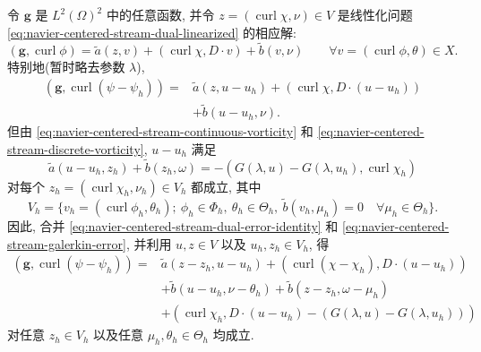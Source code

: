 \begin{Proof}
令 $\boldsymbol g$ 是 $L^2(\Omega)^2$ 中的任意函数, 并令
$z=(\operatorname{curl}\chi,\nu)\in V$ 是线性化问题
\eqref{eq:navier-centered-stream-dual-linearized} 的相应解:
\[
(\boldsymbol g,\operatorname{curl}\phi)
=\widetilde a(z,v)+(\operatorname{curl}\chi,D\cdot v)
+\widetilde b(v,\nu)
\qquad
\forall v=(\operatorname{curl}\phi,\theta)\in X.
\]
特别地(暂时略去参数 $\lambda$),
\begin{equation}\label{eq:navier-centered-stream-dual-error-identity}
\begin{aligned}
(\boldsymbol g,\operatorname{curl}(\psi-\psi_h))
={}&\widetilde a(z,u-u_h)
+(\operatorname{curl}\chi,D\cdot(u-u_h))\\
&+\widetilde b(u-u_h,\nu).
\end{aligned}
\end{equation}
但由 \eqref{eq:navier-centered-stream-continuous-vorticity} 和
\eqref{eq:navier-centered-stream-discrete-vorticity}, $u-u_h$ 满足
\begin{equation}\label{eq:navier-centered-stream-galerkin-error}
\widetilde a(u-u_h,z_h)+\widetilde b(z_h,\omega)
=-(G(\lambda,u)-G(\lambda,u_h),\operatorname{curl}\chi_h)
\end{equation}
对每个 $z_h=(\operatorname{curl}\chi_h,\nu_h)\in V_h$ 都成立, 其中
\[
V_h=\{v_h=(\operatorname{curl}\phi_h,\theta_h);
\ \phi_h\in\Phi_h,\ \theta_h\in\Theta_h,
\ \widetilde b(v_h,\mu_h)=0
\quad\forall\mu_h\in\Theta_h\}.
\]
因此, 合并 \eqref{eq:navier-centered-stream-dual-error-identity} 和
\eqref{eq:navier-centered-stream-galerkin-error}, 并利用
$u,z\in V$ 以及 $u_h,z_h\in V_h$, 得
\[
\begin{aligned}
(\boldsymbol g,\operatorname{curl}(\psi-\psi_h))
={}&\widetilde a(z-z_h,u-u_h)
+(\operatorname{curl}(\chi-\chi_h),D\cdot(u-u_h))\\
&+\widetilde b(u-u_h,\nu-\theta_h)
+\widetilde b(z-z_h,\omega-\mu_h)\\
&+(\operatorname{curl}\chi_h,
D\cdot(u-u_h)-(G(\lambda,u)-G(\lambda,u_h)))
\end{aligned}
\]
对任意 $z_h\in V_h$ 以及任意 $\mu_h,\theta_h\in\Theta_h$ 均成立.


\end{Proof}
